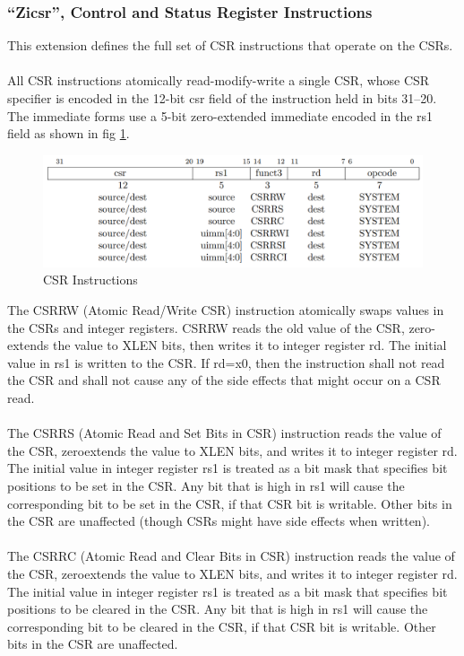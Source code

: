 \documentclass[../main.tex]{subfiles}
\begin{document}
\subsubsection*{“Zicsr”, Control and Status Register Instructions}
This extension defines the full set of CSR instructions that operate on the CSRs.\\
\\All CSR instructions atomically read-modify-write a single CSR, whose CSR specifier is encoded in the 12-bit csr field of the instruction held in bits 31–20. The immediate forms use a 5-bit zero-extended immediate encoded in the rs1 field as shown in fig \ref{fig:csr_inst}.
\begin{figure}[t]
\centering
\includegraphics[width=15 cm]{diagrams/csr_inst.png}
\caption{CSR Instructions}
\label{fig:csr_inst}
\end{figure}
The CSRRW (Atomic Read/Write CSR) instruction atomically swaps values in the CSRs and integer registers. CSRRW reads the old value of the CSR, zero-extends the value to XLEN bits, then writes it to integer register rd. The initial value in rs1 is written to the CSR. If rd=x0, then the instruction shall not read the CSR and shall not cause any of the side effects that might occur
on a CSR read.\\
\\The CSRRS (Atomic Read and Set Bits in CSR) instruction reads the value of the CSR, zeroextends the value to XLEN bits, and writes it to integer register rd. The initial value in integer register rs1 is treated as a bit mask that specifies bit positions to be set in the CSR. Any bit that is high in rs1 will cause the corresponding bit to be set in the CSR, if that CSR bit is writable. Other bits in the CSR are unaffected (though CSRs might have side effects when written).\\
\\The CSRRC (Atomic Read and Clear Bits in CSR) instruction reads the value of the CSR, zeroextends the value to XLEN bits, and writes it to integer register rd. The initial value in integer register rs1 is treated as a bit mask that specifies bit positions to be cleared in the CSR. Any bit that is high in rs1 will cause the corresponding bit to be cleared in the CSR, if that CSR bit is writable. Other bits in the CSR are unaffected.\\
\end{document}
